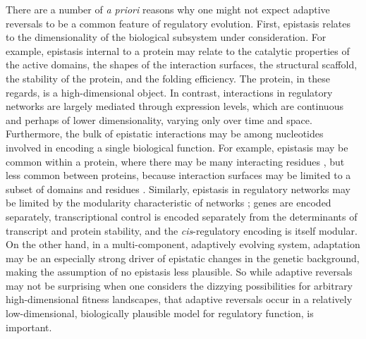 \documentclass[dvips,12pt,twoside,titlepage]{article}
\begin{document}
There are a number of \emph{a priori} reasons why one might not expect adaptive reversals to be a common feature of regulatory evolution. 
First, epistasis relates to the dimensionality of the biological subsystem under consideration.
For example, epistasis internal to a protein may relate to the catalytic properties of the active domains, the shapes of the interaction surfaces, the structural scaffold, the stability of the protein, and the folding efficiency. 
The protein, in these regards, is a high-dimensional object.
In contrast, interactions in regulatory networks are largely mediated through expression levels, which are continuous and perhaps of lower dimensionality, varying only over time and space. 
Furthermore, the bulk of epistatic interactions may be among nucleotides involved in encoding a single biological function.
For example, epistasis may be common within a protein, where there may be many interacting residues \cite{Lunzer:2010co}, but less common between proteins, because interaction surfaces may be limited to a subset of domains and residues \cite{Heger:2003ts}.
Similarly, epistasis in regulatory networks may be limited by the modularity characteristic of networks \cite{Hartwell:1999ef,Alon:2003bh}; genes are encoded separately, transcriptional control is encoded separately from the determinants of transcript and protein stability, and the \emph{cis}-regulatory encoding is itself modular. 
On the other hand, in a multi-component, adaptively evolving system, adaptation may be an especially strong driver of epistatic changes in the genetic background, making the assumption of no epistasis less plausible.
So while adaptive reversals may not be surprising when one considers the dizzying possibilities for arbitrary high-dimensional fitness landscapes, that adaptive reversals occur in a relatively low-dimensional, biologically plausible model for regulatory function, is important.
\end{document}

